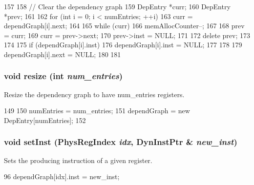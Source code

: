 \begin{DoxyCode}
157 {
158     // Clear the dependency graph
159     DepEntry *curr;
160     DepEntry *prev;
161 
162     for (int i = 0; i < numEntries; ++i) {
163         curr = dependGraph[i].next;
164 
165         while (curr) {
166             memAllocCounter--;
167 
168             prev = curr;
169             curr = prev->next;
170             prev->inst = NULL;
171 
172             delete prev;
173         }
174 
175         if (dependGraph[i].inst) {
176             dependGraph[i].inst = NULL;
177         }
178 
179         dependGraph[i].next = NULL;
180     }
181 }
\end{DoxyCode}
\hypertarget{classDependencyGraph_a3780426d320e4d44a0bc9f44ce6c2175}{
\subsubsection[{resize}]{\setlength{\rightskip}{0pt plus 5cm}void resize (int {\em num\_\-entries})}}
\label{classDependencyGraph_a3780426d320e4d44a0bc9f44ce6c2175}
Resize the dependency graph to have num\_\-entries registers. 


\begin{DoxyCode}
149 {
150     numEntries = num_entries;
151     dependGraph = new DepEntry[numEntries];
152 }
\end{DoxyCode}
\hypertarget{classDependencyGraph_ade8120ce15ebff1cb55df7995a51d237}{
\subsubsection[{setInst}]{\setlength{\rightskip}{0pt plus 5cm}void setInst ({\bf PhysRegIndex} {\em idx}, \/  DynInstPtr \& {\em new\_\-inst})}}
\label{classDependencyGraph_ade8120ce15ebff1cb55df7995a51d237}
Sets the producing instruction of a given register. 


\begin{DoxyCode}
96     { dependGraph[idx].inst = new_inst; }
\end{DoxyCode}


